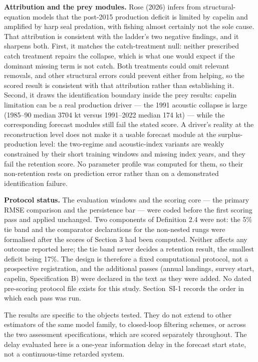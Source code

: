 \documentclass[11pt]{article}
\begin{document}
\textbf{Attribution and the prey modules.} Rose (2026) infers from
structural-equation models that the post-2015 production deficit is
limited by capelin and amplified by harp seal predation, with fishing
almost certainly not the sole cause. That attribution is consistent with
the ladder's two negative findings, and it sharpens both. First, it
matches the catch-treatment null: neither prescribed catch treatment
repairs the collapse, which is what one would expect if the dominant
missing term is not catch. Both treatments could omit relevant
removals, and other structural errors could prevent either from helping,
so the scored result is consistent with that attribution rather than
establishing it. Second, it draws the
identification boundary inside the prey results: capelin limitation can
be a real production driver --- the 1991 acoustic collapse is large
(1985--90 median 3704 kt versus 1991--2022 median 174 kt) --- while the
corresponding forecast modules still fail the stated score. A driver's
reality at the reconstruction level does not make it a usable forecast
module at the surplus-production level: the two-regime and
acoustic-index variants are weakly constrained by their short training
windows and missing index years, and they fail the retention score. No
parameter profile was computed for them, so their non-retention rests
on prediction error rather than on a demonstrated identification
failure.

\textbf{Protocol status.} The evaluation windows and the scoring core
--- the primary RMSE comparison and the persistence bar --- were coded
before the first scoring pass and applied unchanged. Two components of
Definition 2.4 were not: the 5\% tie band and the comparator
declarations for the non-nested rungs were formalised after the scores
of Section 3 had been computed. Neither affects any outcome reported
here; the tie band never decides a retention result, the smallest
deficit being 17\%. The design is therefore a fixed computational
protocol, not a prospective registration, and the additional passes
(annual landings, survey start, capelin, Specification B) were declared
in the text as they were added. No dated pre-scoring protocol file exists for this study.
Section~SI-1 records the order in which each pass was run.

The results are specific to the objects tested. They do not extend to
other estimators of the same model family, to closed-loop filtering
schemes, or across the two assessment specifications, which are scored
separately throughout. The delay evaluated here is a one-year
information delay in the forecast start state, not a continuous-time
retarded system.
\end{document}
